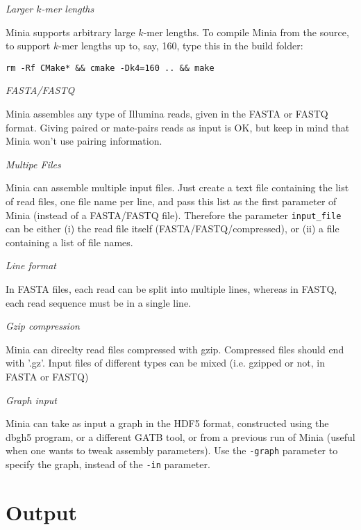 \documentclass[a4paper]{article}
\begin{document}
\begin{description}
\item \emph{Larger $k$-mer lengths}

Minia supports arbitrary large $k$-mer lengths. To compile Minia from the source, to support $k$-mer lengths up to, say, 160, type this in the build folder:
\begin{verbatim}
rm -Rf CMake* && cmake -Dk4=160 .. && make
\end{verbatim}

\item \emph{FASTA/FASTQ}

Minia assembles any type of Illumina reads, given in the FASTA or FASTQ format. Giving paired or mate-pairs reads as input is OK, but keep in mind that Minia won't use pairing information.
\item \emph{Multipe Files}

 Minia can assemble multiple input files. Just create a text file containing the list of read files, one file name per line, and pass this list as the first parameter of Minia (instead of a FASTA/FASTQ file). Therefore the parameter \verb+input_file+ can be either (i) the read file itself (FASTA/FASTQ/compressed), or (ii) a file containing a list of file names.

\item \emph{Line format}

 In FASTA files, each read can be split into multiple lines, whereas in FASTQ, each read sequence must be in a single line.

\item \emph{Gzip compression}

Minia can direclty read files compressed with gzip. Compressed files should end with '.gz'. Input files of different types can be mixed (i.e. gzipped or not, in FASTA or FASTQ)

\item \emph{Graph input}

Minia can take as input a graph in the HDF5 format, constructed using the dbgh5 program, or a different GATB tool, or from a previous run of Minia (useful when one wants to tweak assembly parameters). Use the \verb+-graph+ parameter to specify the graph, instead of the \verb+-in+ parameter.

\end{description}

\section{Output}
\end{document}
